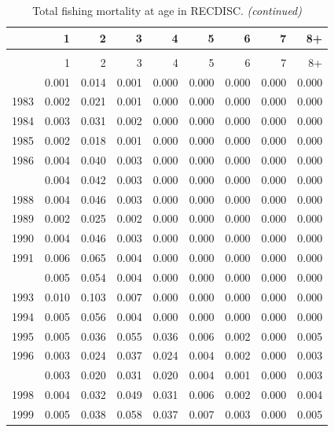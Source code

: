 \documentclass[
]{article}
\begin{document}
\begin{longtable}[t]{lrrrrrrrr}
\caption{\label{tab:RECDISC-fleet-FAA-table}Total fishing mortality at age in RECDISC.}\\
\toprule
  & 1 & 2 & 3 & 4 & 5 & 6 & 7 & 8+\\
\midrule
\endfirsthead
\caption[]{Total fishing mortality at age in RECDISC. \textit{(continued)}}\\
\toprule
  & 1 & 2 & 3 & 4 & 5 & 6 & 7 & 8+\\
\midrule
\endhead

\endfoot
\bottomrule
\endlastfoot
1982 & 0.001 & 0.014 & 0.001 & 0.000 & 0.000 & 0.000 & 0.000 & 0.000\\
1983 & 0.002 & 0.021 & 0.001 & 0.000 & 0.000 & 0.000 & 0.000 & 0.000\\
1984 & 0.003 & 0.031 & 0.002 & 0.000 & 0.000 & 0.000 & 0.000 & 0.000\\
1985 & 0.002 & 0.018 & 0.001 & 0.000 & 0.000 & 0.000 & 0.000 & 0.000\\
1986 & 0.004 & 0.040 & 0.003 & 0.000 & 0.000 & 0.000 & 0.000 & 0.000\\
\addlinespace
1987 & 0.004 & 0.042 & 0.003 & 0.000 & 0.000 & 0.000 & 0.000 & 0.000\\
1988 & 0.004 & 0.046 & 0.003 & 0.000 & 0.000 & 0.000 & 0.000 & 0.000\\
1989 & 0.002 & 0.025 & 0.002 & 0.000 & 0.000 & 0.000 & 0.000 & 0.000\\
1990 & 0.004 & 0.046 & 0.003 & 0.000 & 0.000 & 0.000 & 0.000 & 0.000\\
1991 & 0.006 & 0.065 & 0.004 & 0.000 & 0.000 & 0.000 & 0.000 & 0.000\\
\addlinespace
1992 & 0.005 & 0.054 & 0.004 & 0.000 & 0.000 & 0.000 & 0.000 & 0.000\\
1993 & 0.010 & 0.103 & 0.007 & 0.000 & 0.000 & 0.000 & 0.000 & 0.000\\
1994 & 0.005 & 0.056 & 0.004 & 0.000 & 0.000 & 0.000 & 0.000 & 0.000\\
1995 & 0.005 & 0.036 & 0.055 & 0.036 & 0.006 & 0.002 & 0.000 & 0.005\\
1996 & 0.003 & 0.024 & 0.037 & 0.024 & 0.004 & 0.002 & 0.000 & 0.003\\
\addlinespace
1997 & 0.003 & 0.020 & 0.031 & 0.020 & 0.004 & 0.001 & 0.000 & 0.003\\
1998 & 0.004 & 0.032 & 0.049 & 0.031 & 0.006 & 0.002 & 0.000 & 0.004\\
1999 & 0.005 & 0.038 & 0.058 & 0.037 & 0.007 & 0.003 & 0.000 & 0.005\\

\end{longtable}
\end{document}
